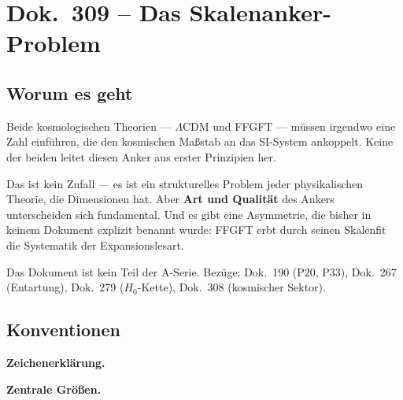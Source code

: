 \maketitle
\tableofcontents

\chapter*{Dok.~309 -- Das Skalenanker-Problem}


\section*{Worum es geht}

Beide kosmologischen Theorien — $\Lambda$CDM und FFGFT — müssen irgendwo
eine Zahl einführen, die den kosmischen Maßstab an das SI-System ankoppelt.
Keine der beiden leitet diesen Anker aus erster Prinzipien her.

Das ist kein Zufall — es ist ein strukturelles Problem jeder physikalischen
Theorie, die Dimensionen hat. Aber \textbf{Art und Qualität} des Ankers
unterscheiden sich fundamental. Und es gibt eine Asymmetrie, die bisher
in keinem Dokument explizit benannt wurde: FFGFT erbt durch seinen
Skalenfit die Systematik der Expansionslesart.

Das Dokument ist kein Teil der A-Serie.
Bezüge: Dok.~190 (P20, P33), Dok.~267 (Entartung), Dok.~279 ($H_0$-Kette),
Dok.~308 (kosmischer Sektor).

\section*{Konventionen}

\noindent\textbf{Zeichenerklärung.}

\medskip


\medskip
\noindent\textbf{Zentrale Größen.}

